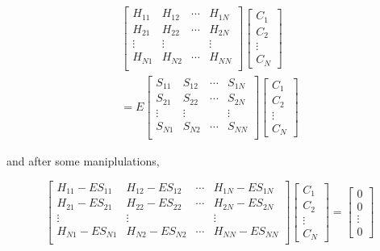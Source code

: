 \documentclass[a4paper]{report}
\begin{document}
\begin{equation}\begin{split}\label{ep4}
\left[
\begin{matrix}
    H_{11} & H_{12} & \cdots & H_{1N} \\
    H_{21} & H_{22} & \cdots & H_{2N} \\
    \vdots               & \vdots               &        & \vdots               \\
     H_{N1} & H_{N2} & \cdots & H_{NN} \\
\end{matrix} \right] \left[ \begin{array}{c} C_1 \\ C_2 \\ \vdots \\ C_N\end{array} \right] \\
=E \left[
\begin{matrix}
    S_{11} & S_{12} & \cdots & S_{1N} \\
    S_{21} & S_{22} & \cdots & S_{2N} \\
    \vdots               & \vdots               &        & \vdots               \\
     S_{N1} & S_{N2} & \cdots & S_{NN} \\
\end{matrix} \right]\left[ \begin{array}{c} C_1 \\ C_2 \\ \vdots \\ C_N\end{array} \right]
\end{split}\end{equation}

\noindent and after some maniplulations, 

\begin{equation}\label{ep44}
\left[
\begin{matrix}
    H_{11} - E S_{11} & H_{12} - E S_{12} & \cdots & H_{1N} - E S_{1N} \\
   H_{21} - E S_{21} & H_{22} - E S_{22} & \cdots & H_{2N} - E S_{2N} \\
    \vdots               & \vdots               &        & \vdots               \\
  H_{N1} - E S_{N1} & H_{N2} - E S_{N2} & \cdots & H_{NN} - E S_{NN} \\
\end{matrix} \right] \left[ \begin{array}{c} C_1 \\ C_2 \\ \vdots \\ C_N\end{array} \right]
=\left[ \begin{array}{c} 0 \\ 0 \\ \vdots \\ 0 \end{array} \right]
\end{equation}
\end{document}
